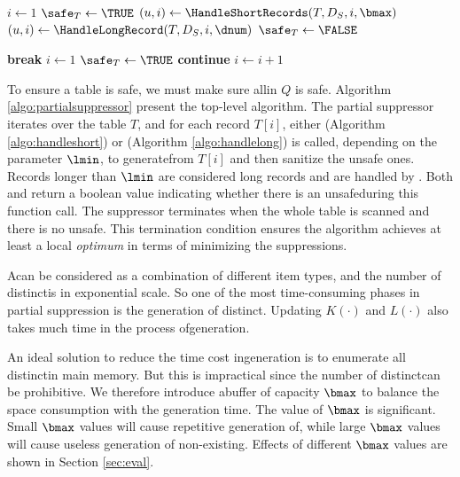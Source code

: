\begin{algorithm}[th]
\caption{$\PartialSuppressor(\reference T, D_S, \rho, \lmin, \bmax, \dnum)$}
\label{algo:partialsuppressor}
\begin{algorithmic}[1]
    \STATE $i\leftarrow 1$
    \STATE $\safe_T\leftarrow\TRUE$
    \LOOP
            \STATE $(u,i)\leftarrow\HandleShortRecords(T, D_S, i, \bmax)$
        \ELSE
            \STATE $(u,i)\leftarrow\HandleLongRecord(T, D_S, i, \dnum)$
        \ENDIF
        { \label{line:partial-suppressor-if-u}
            $\safe_T\leftarrow\FALSE$
        \ENDIF}

          {
            \textbf{break} \label{line:partial-suppressor-break}
          \ENDIF}
          \STATE $i\leftarrow 1$
          \STATE $\safe_T\leftarrow\TRUE$
          \STATE \textbf{continue}
        \ENDIF
        \STATE $i\leftarrow i+1$
    \ENDLOOP
\end{algorithmic}
\end{algorithm}

To ensure a table is safe,
we must make sure all\qids in $Q$ is safe.
Algorithm \ref{algo:partialsuppressor} present the top-level algorithm.
The partial suppressor iterates over the table $T$, and for each record $T[i]$,
either \HandleShortRecords (Algorithm \ref{algo:handleshort})
or \HandleLongRecord (Algorithm \ref{algo:handlelong}) is called,
depending on the parameter $\lmin$,
to generate\qids from $T[i]$ and then sanitize the unsafe ones.
Records longer than $\lmin$ are considered long records and are handled
by \HandleLongRecord.
Both \HandleShortRecords and \HandleLongRecord return a boolean value
indicating whether there is an unsafe\qid during this function call.
The suppressor terminates when the whole table is scanned and
there is no unsafe\qidx. This termination condition ensures the algorithm
achieves at least a local {\em optimum} in terms of minimizing the
suppressions.

A\qid can be considered as a combination of different item types,
  and the number of distinct\qids is in exponential scale.
So one of the most time-consuming phases in partial suppression is
  the generation of distinct\qidsx.
Updating $K(\cdot)$ and $L(\cdot)$ also takes much time
  in the process of\qid generation.

An ideal solution to reduce the time cost in\qid generation is
to enumerate all distinct\qids in main memory.
But this is impractical since the number of distinct\qids can be
prohibitive.
We therefore introduce a\qid buffer of capacity $\bmax$ to balance
the space consumption with the generation time.
The value of $\bmax$ is significant.
Small $\bmax$ values will cause repetitive generation of\qidsx,
while large $\bmax$ values will cause useless generation of
non-existing\qidsx. Effects of different $\bmax$ values are shown
in Section \ref{sec:eval}.

